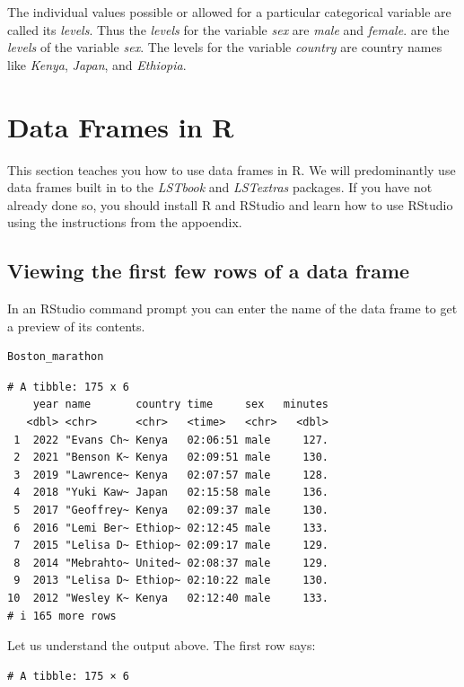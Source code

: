\documentclass[
  12pt,
  letterpaper,
  DIV=11,
  numbers=noendperiod]{scrreprt}
\begin{document}
The individual values possible or allowed for a particular categorical
variable are called its \emph{levels}. Thus the \emph{levels} for the
variable \emph{sex} are \emph{male} and \emph{female}. are the
\emph{levels} of the variable \emph{sex}. The levels for the variable
\emph{country} are country names like \emph{Kenya}, \emph{Japan}, and
\emph{Ethiopia}.

\section{Data Frames in R}\label{data-frames-in-r}

This section teaches you how to use data frames in R. We will
predominantly use data frames built in to the \emph{LSTbook} and
\emph{LSTextras} packages. If you have not already done so, you should
install R and RStudio and learn how to use RStudio using the
instructions from the appoendix.

\subsection{Viewing the first few rows of a data
frame}\label{viewing-the-first-few-rows-of-a-data-frame}

In an RStudio command prompt you can enter the name of the data frame to
get a preview of its contents.

\begin{lstlisting}[language=R]
Boston_marathon
\end{lstlisting}

\begin{lstlisting}
# A tibble: 175 x 6
    year name       country time     sex   minutes
   <dbl> <chr>      <chr>   <time>   <chr>   <dbl>
 1  2022 "Evans Ch~ Kenya   02:06:51 male     127.
 2  2021 "Benson K~ Kenya   02:09:51 male     130.
 3  2019 "Lawrence~ Kenya   02:07:57 male     128.
 4  2018 "Yuki Kaw~ Japan   02:15:58 male     136.
 5  2017 "Geoffrey~ Kenya   02:09:37 male     130.
 6  2016 "Lemi Ber~ Ethiop~ 02:12:45 male     133.
 7  2015 "Lelisa D~ Ethiop~ 02:09:17 male     129.
 8  2014 "Mebrahto~ United~ 02:08:37 male     129.
 9  2013 "Lelisa D~ Ethiop~ 02:10:22 male     130.
10  2012 "Wesley K~ Kenya   02:12:40 male     133.
# i 165 more rows
\end{lstlisting}

Let us understand the output above. The first row says:

\begin{lstlisting}
# A tibble: 175 × 6
\end{lstlisting}
\end{document}
